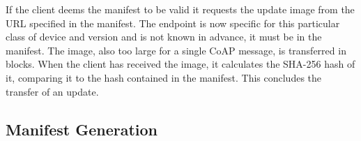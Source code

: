 \documentclass[0-thesis.tex]{subfiles}
\begin{document}
If the client deems the manifest to be valid it requests the update image from the URL
specified in the manifest. The endpoint is now specific for this particular class of
device and version and is not known in advance, it must be in the manifest. The image,
also too large for a single CoAP message, is transferred in blocks. When the client has
received the image, it calculates the SHA-256 hash of it, comparing it to the hash
contained in the manifest. This concludes the transfer of an update.

\subsection{Manifest Generation}
\end{document}
